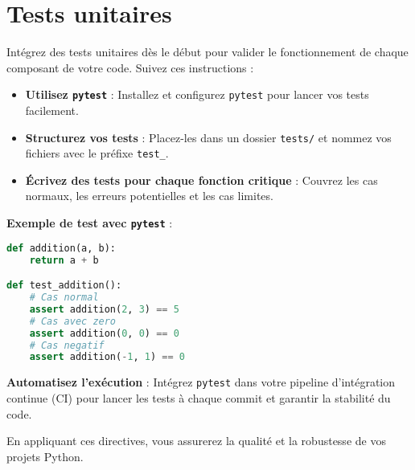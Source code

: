 \documentclass[a4paper,12pt]{article}
\begin{document}

\section{Tests unitaires}

Intégrez des tests unitaires dès le début pour valider le fonctionnement de chaque composant de votre code. Suivez ces instructions :

\begin{itemize}
    \item \textbf{Utilisez \texttt{pytest}} : Installez et configurez \texttt{pytest} pour lancer vos tests facilement.
    \item \textbf{Structurez vos tests} : Placez-les dans un dossier \texttt{tests/} et nommez vos fichiers avec le préfixe \texttt{test\_}.
    \item \textbf{Écrivez des tests pour chaque fonction critique} : Couvrez les cas normaux, les erreurs potentielles et les cas limites.
\end{itemize}

\textbf{Exemple de test avec \texttt{pytest}} :

\begin{lstlisting}[language=python]
def addition(a, b):
    return a + b

def test_addition():
    # Cas normal
    assert addition(2, 3) == 5
    # Cas avec zero
    assert addition(0, 0) == 0
    # Cas negatif
    assert addition(-1, 1) == 0
\end{lstlisting}

\textbf{Automatisez l'exécution} : Intégrez \texttt{pytest} dans votre pipeline d'intégration continue (CI) pour lancer les tests à chaque commit et garantir la stabilité du code.

En appliquant ces directives, vous assurerez la qualité et la robustesse de vos projets Python.
\end{document}

